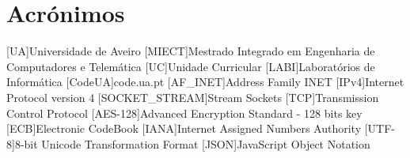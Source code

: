 
 
	
	
	
	
	
	

\renewcommand{\contentsname}{Índice}
\tableofcontents
\listoffigures
{}


\chapter*{Acrónimos}
\begin{acronym}

[UA]{Universidade de Aveiro}
[MIECT]{Mestrado Integrado em Engenharia de Computadores e Telemática}
[UC]{Unidade Curricular}
[LABI]{Laboratórios de Informática}
[CodeUA]{code.ua.pt}
[AF\_INET]{Address Family INET}
[IPv4]{Internet Protocol version 4}
[SOCKET\_STREAM]{Stream Sockets}
[TCP]{Transmission Control Protocol}
[AES-128]{Advanced Encryption Standard - 128 bits key}
[ECB]{Electronic CodeBook}
[IANA]{Internet Assigned Numbers Authority}
[UTF-8]{8-bit Unicode Transformation Format}
[JSON]{JavaScript Object Notation}

\end{acronym}


\pagestyle{fancy}
\fancyhf{}
\rhead{\titulo}
\cfoot{\thepage}


